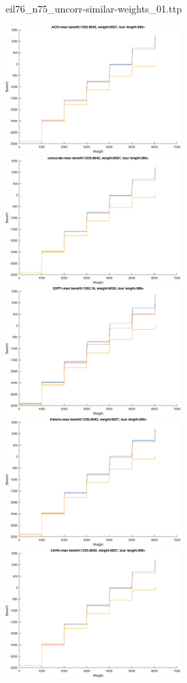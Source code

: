 \documentclass{article}
\begin{document}
\newpage
eil76\_n75\_uncorr-similar-weights\_01.ttp

\noindent
\includegraphics[width=0.5\textwidth]{eil76figs/eil76_n75_uncorr-similar-weights_01.ttp.aco.txt.atsf.eps}
\includegraphics[width=0.5\textwidth]{eil76figs/eil76_n75_uncorr-similar-weights_01.ttp.con.txt.atsf.eps}
\includegraphics[width=0.5\textwidth]{eil76figs/eil76_n75_uncorr-similar-weights_01.ttp.inv.txt.atsf.eps}
\includegraphics[width=0.5\textwidth]{eil76figs/eil76_n75_uncorr-similar-weights_01.ttp.lkh.txt.atsf.eps}
\includegraphics[width=0.5\textwidth]{eil76figs/eil76_n75_uncorr-similar-weights_01.ttp.lkh2.txt.atsf.eps}
\end{document}
